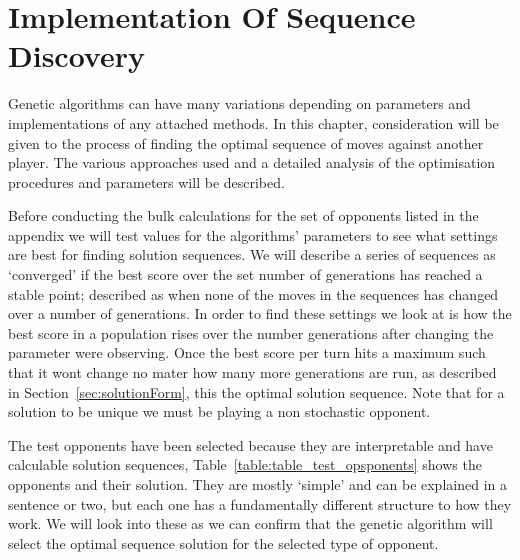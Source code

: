 \chapter{Implementation Of Sequence Discovery}\label{ch:implementation}
Genetic algorithms can have many variations depending on parameters and implementations of any attached methods. In this chapter, consideration will be given to the process of finding the optimal sequence of moves against another player.
The various approaches used and a detailed analysis of the optimisation procedures and parameters will be described.

Before conducting the bulk calculations for the set of opponents listed in the appendix we will test values for the algorithms' parameters to see what settings are best for finding solution sequences.
We will describe a series of sequences as `converged' if the best score over the set number of generations has reached a stable point;
described as when none of the moves in the sequences has changed over a number of generations.
In order to find these settings we look at is how the best score in a population rises over the number generations after changing the parameter were observing.
Once the best score per turn hits a maximum such that it wont change no mater how many more generations are run, as described in Section~\ref{sec:solutionForm}, this the optimal solution sequence.
Note that for a solution to be unique we must be playing a non stochastic opponent.

The test opponents have been selected because they are interpretable and have calculable solution sequences, Table~\ref{table:table_test_opsponents} shows the opponents and their solution.
They are mostly `simple' and can be explained in a sentence or two, but each one has a fundamentally different structure to how they work.
We will look into these as we can confirm that the genetic algorithm will select the optimal sequence solution for the selected type of opponent.

